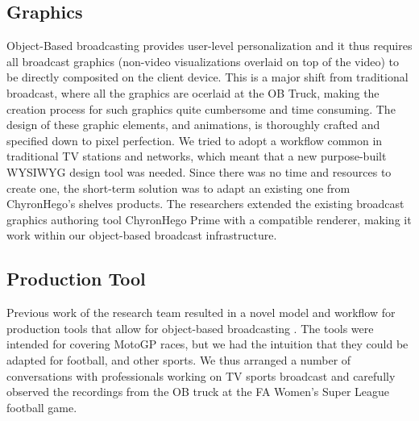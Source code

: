 \documentclass[sigchi-a, authorversion]{acmart}
\begin{document}

\subsection{Graphics}
Object-Based broadcasting provides user-level personalization and it thus requires all broadcast graphics (non-video visualizations overlaid on top of the video) to be directly composited on the client device. This is a major shift from traditional broadcast, where all the graphics are ocerlaid at the OB Truck, making the creation process for such graphics quite cumbersome and time consuming. The design of these graphic elements, and animations, is thoroughly crafted and specified down to pixel perfection. We tried to adopt a workflow common in traditional TV stations and networks, which meant that a new purpose-built WYSIWYG design tool was needed. Since there was no time and resources to create one, the short-term solution was to adapt an existing one from ChyronHego's shelves products. The researchers extended the existing broadcast graphics authoring tool ChyronHego Prime with a compatible renderer, making it work within our object-based broadcast infrastructure.

\subsection{Production Tool}
Previous work of the research team resulted in a novel model and workflow for production tools that allow for object-based broadcasting \cite{Li:2018_TVX}. The tools were intended for covering MotoGP races, but we had the intuition that they could be adapted for football, and other sports. We thus arranged a number of conversations with professionals working on TV sports broadcast and carefully observed the recordings from the OB truck at the FA Women’s Super League football game. 
\end{document}
